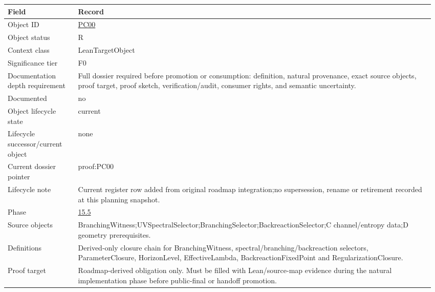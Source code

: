 \begin{longtable}{L{0.16\linewidth} L{0.81\linewidth}}
\hline
\textbf{Field} & \textbf{Record}\\
\hline
Object ID & \hyperlink{object-row-PC00}{PC00}\\
\hline\addlinespace[0.20em]
Object status & R\\
\hline\addlinespace[0.20em]
Context class & LeanTargetObject\\
\hline\addlinespace[0.20em]
Significance tier & F0\\
\hline\addlinespace[0.20em]
Documentation depth requirement & Full dossier required before promotion or consumption: definition, natural provenance, exact source objects, proof target, proof sketch, verification/\allowbreak{}audit, consumer rights, and semantic uncertainty.\\
\hline\addlinespace[0.20em]
Documented & no\\
\hline\addlinespace[0.20em]
Object lifecycle state & current\\
\hline\addlinespace[0.20em]
Lifecycle successor/\allowbreak{}current object & none\\
\hline\addlinespace[0.20em]
Current dossier pointer & proof:PC00\\
\hline\addlinespace[0.20em]
Lifecycle note & Current register row added from original roadmap integration;\newline no supersession, rename or retirement recorded at this planning snapshot.\\
\hline\addlinespace[0.20em]
Phase & \hyperlink{phase-row-15-5}{15.5}\\
\hline\addlinespace[0.20em]
Source objects & BranchingWitness;\newline UVSpectralSelector;\newline BranchingSelector;\newline BackreactionSelector;\newline C channel/\allowbreak{}entropy data;\newline D geometry prerequisites.\\
\hline\addlinespace[0.20em]
Definitions & Derived-only closure chain for BranchingWitness, spectral/\allowbreak{}branching/\allowbreak{}backreaction selectors, ParameterClosure, HorizonLevel, EffectiveLambda, BackreactionFixedPoint and RegularizationClosure.\\
\hline\addlinespace[0.20em]
Proof target & Roadmap-derived obligation only. Must be filled with Lean/\allowbreak{}source-map evidence during the natural implementation phase before public-final or handoff promotion.\\

\end{longtable}
